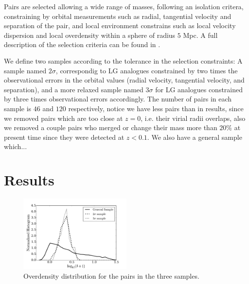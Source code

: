 \documentclass{emulateapj}
\newcommand{\mpc}{\rm{Mpc}}
\begin{document}
Pairs are selected allowing a wide range of masses, following an
isolation critera, constraining by orbital measurements such as
radial, tangential velocity and separation of the pair, and local
environment constrains such as local velocity dispersion and local
overdensity within a sphere of radius $5$ \mpc. A full description of
the selection criteria can be found in \citet{lganalogues,sat}. 

We define two samples according to the tolerance in the selection constraints:
A sample named $2\sigma$, correspondig to LG analogues constrained by
two times the observational errors in the orbital values (radial
velocity, tangential velocity, and separation), and a more relaxed
sample named $3\sigma$ for LG analogues constrained by three times
observational errors accordingly. The number of pairs in each sample
is $46$ and $120$ respectively, notice we have less pairs than in
\citet{lganalogues} results, since we removed pairs which are too
close at $z=0$, i.e. their virial radii overlaps, also we removed a
couple pairs who merged or change their mass more than $20\%$ at
present time since they were detected at $z<0.1$.  We also have a
general sample which...


\section{Results}
\label{sec:results}


\begin{figure}
\begin{center}
  \includegraphics[width=0.50\textwidth]{density_histogram.pdf}
\end{center}
\caption{Overdensity distribution for the pairs in the three samples.
    \label{fig:density}}  
\end{figure}
\end{document}
